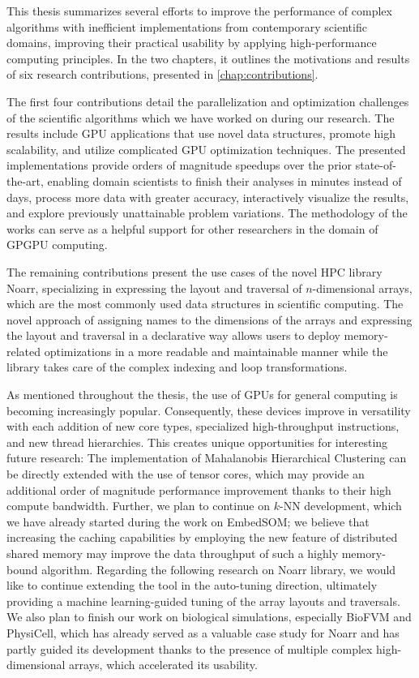 
This thesis summarizes several efforts to improve the performance of complex algorithms with inefficient implementations from contemporary scientific domains, improving their practical usability by applying high-performance computing principles. In the two chapters, it outlines the motivations and results of six research contributions, presented in \cref{chap:contributions}.

The first four contributions detail the parallelization and optimization challenges of the scientific algorithms which we have worked on during our research. The results include GPU applications that use novel data structures, promote high scalability, and utilize complicated GPU optimization techniques. The presented implementations provide orders of magnitude speedups over the prior state-of-the-art, enabling domain scientists to finish their analyses in minutes instead of days, process more data with greater accuracy, interactively visualize the results, and explore previously unattainable problem variations. The methodology of the works can serve as a helpful support for other researchers in the domain of GPGPU computing.

The remaining contributions present the use cases of the novel HPC library Noarr, specializing in expressing the layout and traversal of $n$-dimensional arrays, which are the most commonly used data structures in scientific computing. The novel approach of assigning names to the dimensions of the arrays and expressing the layout and traversal in a declarative way allows users to deploy memory-related optimizations in a more readable and maintainable manner while the library takes care of the complex indexing and loop transformations.

As mentioned throughout the thesis, the use of GPUs for general computing is becoming increasingly popular. Consequently, these devices improve in versatility with each addition of new core types, specialized high-throughput instructions, and new thread hierarchies. This creates unique opportunities for interesting future research: The implementation of Mahalanobis Hierarchical Clustering can be directly extended with the use of tensor cores, which may provide an additional order of magnitude performance improvement thanks to their high compute bandwidth. Further, we plan to continue on $k$-NN development, which we have already started during the work on EmbedSOM; we believe that increasing the caching capabilities by employing the new feature of distributed shared memory may improve the data throughput of such a highly memory-bound algorithm. Regarding the following research on Noarr library, we would like to continue extending the tool in the auto-tuning direction, ultimately providing a machine learning-guided tuning of the array layouts and traversals. We also plan to finish our work on biological simulations, especially BioFVM and PhysiCell, which has already served as a valuable case study for Noarr and has partly guided its development thanks to the presence of multiple complex high-dimensional arrays, which accelerated its usability.

